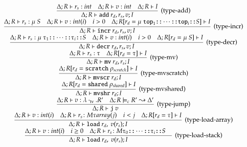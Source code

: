 \begin{equation*}
    \begin{array}{c}
        \infer[(\text{type-add})]
            {\Delta; R \vdash \add\ r_d, r_s, v; I}
            {\Delta; R \vdash r_s : int &
            \Delta; R \vdash v : int &
            \Delta; R \vdash I}
        \\
        \infer[(\text{type-incr})]
            {\Delta; R \vdash \incr\ r_d, r_s, v; I}
            {\Delta; R \vdash r_s : \mu\ S &
            \Delta; R \vdash v : int(i) &
            i > 0 &
            \Delta;
            R[r_d = \mu\ \ttop_1 \cons \cdots \cons \ttop_i \cons S]
            \vdash I}
        \\
        \infer[(\text{type-decr})]
            {\Delta; R \vdash \decr\ r_d, r_s, v; I}
            {\Delta;
                R \vdash r_s :
                \mu\ \tau_1 \cons \cdots \cons \tau_i \cons S &
            \Delta; R \vdash v : int(i) &
            i > 0 &
            \Delta; R[r_d = \mu\ S] \vdash I}
        \\
        \infer[(\text{type-mv})]
            {\Delta; R \vdash \mv\ r_d, r_s; I}
            {\Delta;
            R \vdash r_s : \tau &
            \Delta; R[r_d = \tau] \vdash I}
        \\
        \infer[(\text{type-mvscratch})]
            {\Delta; R \vdash \mvscratch\ r_d; I}
            {\Delta; R[r_d = \scratch\ \rho_{scratch}] \vdash I}
        \\
        \infer[(\text{type-mvshared})]
            {\Delta; R \vdash \mvshared\ r_d; I}
            {\Delta; R[r_d = \shared\ \rho_{shared}] \vdash I}
        \\
        \infer[(\text{type-jump})]
            {\Delta; R \vdash \jump\ v}
            {
                \Delta; R \vdash v : \lambda \emptytv. R' &
                \Delta; R \models_c R' \leadsto \Delta'
            }
        \\
        \infer[(\text{type-load-array})]
            {\Delta; R \vdash \load\ r_d,\ v(r_s); I}
            {
                \Delta; R \vdash v : int(i) &
                \Delta; R \vdash r_s \colon M \tau array(j) &
                i < j &
                \Delta; R[r_d = \tau] \vdash I
            }
        \\
        \infer[(\text{type-load-stack})]
            {\Delta; R \vdash \load\ r_d,\ v(r_s); I}
            {
                \Delta; R \vdash v : int(i) &
                i \geq 0 &
                \Delta; R \vdash r_s \colon M \tau_0 \cons \cdots \cons \tau_i \cons S &
}
\end{array}
\end{equation*}
